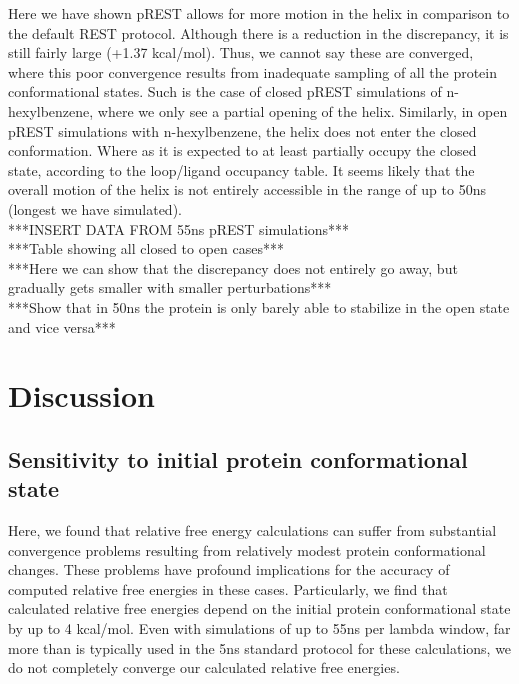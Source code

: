 \documentclass[journal=jctcce,manuscript=article]{achemso}
\begin{document}
Here we have shown pREST allows for more motion in the helix in comparison to the default REST protocol.
Although there is a reduction in the discrepancy, it is still fairly large (+1.37 kcal/mol).
Thus, we cannot say these are converged, where this poor convergence results from inadequate sampling of all the protein conformational states.
Such is the case of closed pREST simulations of n-hexylbenzene, where we only see a partial opening of the helix.
Similarly, in open pREST simulations with n-hexylbenzene, the helix does not enter the closed conformation.
Where as it is expected to at least partially occupy the closed state, according to the loop/ligand occupancy table.
It seems likely that the overall motion of the helix is not entirely accessible in the range of up to 50ns (longest we have simulated).\\

***INSERT DATA FROM 55ns pREST simulations***\\
***Table showing all closed to open cases***\\
***Here we can show that the discrepancy does not entirely go away, but gradually gets smaller with smaller perturbations***\\
***Show that in 50ns the protein is only barely able to stabilize in the open state and vice versa***\\

\section{Discussion}
\subsection*{Sensitivity to initial protein conformational state}
Here, we found that relative free energy calculations can suffer from substantial convergence problems resulting from relatively modest protein conformational changes.
These problems have profound implications for the accuracy of computed relative free energies in these cases.
Particularly, we find that calculated relative free energies depend on the initial protein conformational state by up to 4 kcal/mol.
Even with simulations of up to 55ns per lambda window, far more than is typically used in the 5ns standard protocol for these calculations, we do not completely converge our calculated relative free energies.
\end{document}
